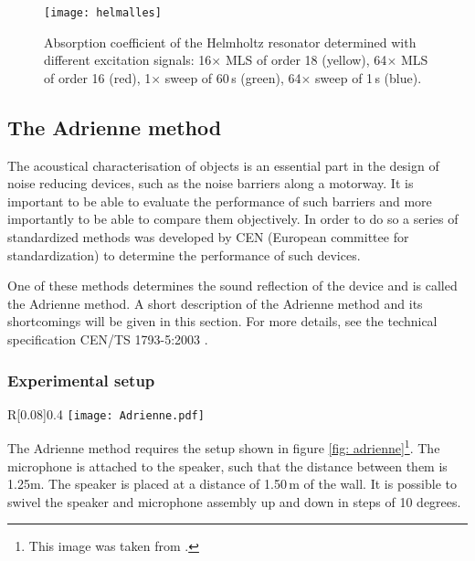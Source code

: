 \begin{figure}[h!]
  \centering
    \texttt{[image: helmalles]}
  \caption{Absorption coefficient of the Helmholtz resonator determined with different excitation signals: 16$\times$ MLS of order 18 (yellow), 64$\times$ MLS of order 16 (red), 1$\times$ sweep of 60\,s (green), 64$\times$ sweep of 1\,s (blue).}
  \label{fig: helmholtzalles}
\end{figure}


\subsection{The Adrienne method}
The acoustical characterisation of objects is an essential part in the design of noise reducing devices, such as the noise barriers along a motorway. It is important to be able to evaluate the performance of such barriers and more importantly to be able to compare them objectively. In order to do so a series of standardized methods was developed by CEN (European committee for standardization) to determine the performance of such devices.

One of these methods determines the sound reflection of the device and is called the Adrienne method. A short description of the Adrienne method and its shortcomings will be given in this section. For more details, see the technical specification CEN/TS 1793-5:2003 \cite{Adrienne}.



\subsubsection{Experimental setup}

\begin{wrapfigure}{R}[0.08\textwidth]{0.4\textwidth}
  \centering
    \texttt{[image: Adrienne.pdf]}
  \caption{Setup for the reflection index measurements according to the Adrienne method.}
  \label{fig: adrienne}
\end{wrapfigure}
The Adrienne method requires the setup shown in figure \ref{fig: adrienne}\footnote{This image was taken from \cite[p.45]{Geetere}.}. The microphone is attached to the speaker, such that the distance between them is 1.25m. The speaker is placed at a distance of 1.50\,m of the wall. It is possible to swivel the speaker and microphone assembly up and down in steps of 10 degrees.

